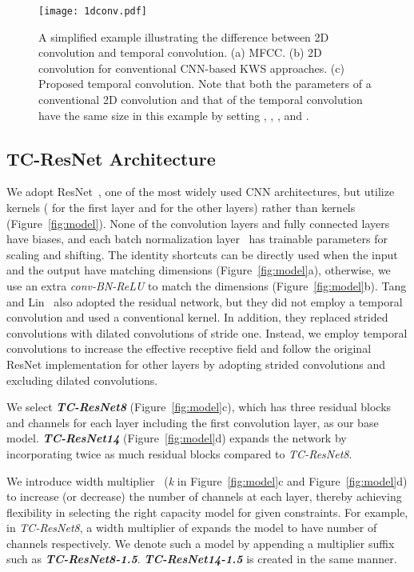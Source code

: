\documentclass[a4paper]{article}
\begin{document}
\begin{figure}[h]
    \texttt{[image: 1dconv.pdf]}
    \caption{A simplified example illustrating the difference between 2D convolution and temporal convolution. (a) MFCC. (b) 2D convolution for conventional CNN-based KWS approaches. (c) Proposed temporal convolution. Note that both the parameters of a conventional 2D convolution and that of the temporal convolution have the same size in this example by setting , , , and .}
    \vspace{-0.2cm}
    \label{fig:1dconv}
\end{figure}


\subsection{TC-ResNet Architecture} \label{subsection:architecture}

We adopt ResNet~\cite{he-cvpr-2016-resnet}, one of the most widely used CNN architectures, but utilize  kernels ( for the first layer and  for the other layers) rather than  kernels (Figure~\ref{fig:model}).
None of the convolution layers and fully connected layers have biases, and each batch normalization layer~\cite{ioffe-arxiv-2015-batchnormalization} has trainable parameters for scaling and shifting.
The identity shortcuts can be directly used when the input and the output have matching dimensions (Figure~\ref{fig:model}a), otherwise, we use an extra \emph{conv-BN-ReLU} to match the dimensions (Figure~\ref{fig:model}b).
Tang and Lin~\cite{tang-icassp-2018-residual} also adopted the residual network, but they did not employ a temporal convolution and used a conventional  kernel.
In addition, they replaced strided convolutions with dilated convolutions of stride one.
Instead, we employ temporal convolutions to increase the effective receptive field and follow the original ResNet implementation for other layers by adopting strided convolutions and excluding dilated convolutions.

We select \textbf{\emph{TC-ResNet8}} (Figure~\ref{fig:model}c), which has three residual blocks and  channels for each layer including the first convolution layer, as our base model.
\textbf{\emph{TC-ResNet14}} (Figure~\ref{fig:model}d) expands the network by incorporating twice as much residual blocks compared to \emph{TC-ResNet8}.

We introduce width multiplier~\cite{howard-arxiv-2017-mobilenet} (\emph{k} in Figure~\ref{fig:model}c and Figure~\ref{fig:model}d) to increase (or decrease) the number of channels at each layer, thereby achieving flexibility in selecting the right capacity model for given constraints.
For example, in \emph{TC-ResNet8}, a width multiplier of  expands the model to have  number of channels respectively.
We denote such a model by appending a multiplier suffix such as \textbf{\emph{TC-ResNet8-1.5}}.
\textbf{\emph{TC-ResNet14-1.5}} is created in the same manner.
\end{document}

